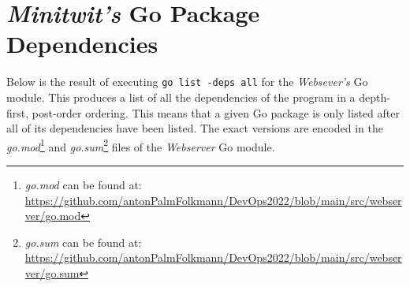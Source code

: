 \section{\textit{Minitwit's} Go Package Dependencies}
\label{app:go-pkg-deps}

Below is the result of executing \texttt{go list -deps all} for the \textit{Websever's} Go module.
This produces a list of all the dependencies of the program in a depth-first, post-order ordering.
This means that a given Go package is only listed after all of its dependencies have been listed.
The exact versions are encoded in the \textit{go.mod}\footnote{\textit{go.mod} can be found at: \url{https://github.com/antonPalmFolkmann/DevOps2022/blob/main/src/webserver/go.mod}} and \textit{go.sum}\footnote{\textit{go.sum} can be found at: \url{https://github.com/antonPalmFolkmann/DevOps2022/blob/main/src/webserver/go.sum}} files of the \textit{Webserver} Go module.

